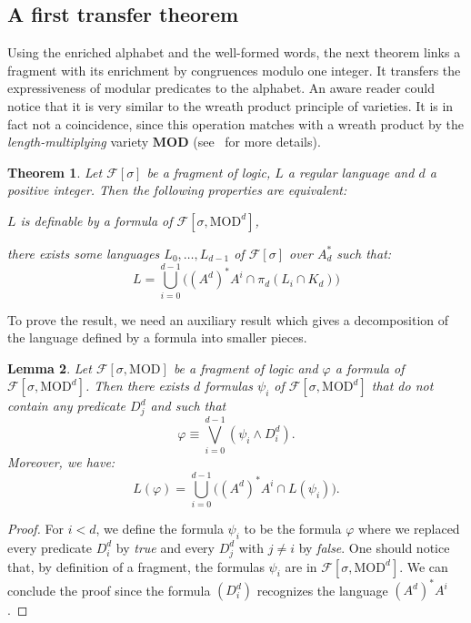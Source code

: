 \documentclass[submission,hidelink]{dmtcs-episciences}
\newtheorem{theorem}{Theorem}
\newtheorem{lemma}[theorem]{Lemma}
\newcommand{\WF}{K}
\newcommand{\cF}{\mathcal{F}}
\newcommand{\Ae}{A_d}
\newcommand{\MOD}{\mathrm{MOD}}
\newcommand{\MODV}{\mathbf{MOD}}
\newcommand{\Fsigmod}{\cF[\sigma,\MOD]}
\newcommand{\Fsigmodd}{\cF[\sigma, \MOD^d]}
\newenvironment{conditions}
{\begin{list}{\rm (\theenumi)}{\noindent \usecounter{enumi}\setlength{\topsep}{2pt}\setlength{\partopsep}{0pt}\setlength{\itemsep}{2pt}\setlength{\parsep}{0pt}\setlength{\leftmargin}{2.5em}\setlength{\labelwidth}{1.5em}\setlength{\labelsep}{0.5em}\setlength{\listparindent}{0pt}\setlength{\itemindent}{0pt}}}{\end{list}}
\begin{document}
\subsection{A first transfer theorem}
Using the enriched alphabet and the well-formed words, the next theorem links a fragment with its enrichment by congruences modulo one integer.
It transfers the expressiveness of modular predicates to the alphabet.
An aware reader could notice that it is very similar to the wreath product principle of varieties. It is in fact not a coincidence, since
this operation matches with a wreath product by the \emph{length-multiplying} variety ${\MODV}$ (see~\cite{CPS06b} for more details).
\begin{theorem}\label{semimod}
			Let $\cF[\sigma]$ be a fragment of logic,
			$L$ a regular language and $d$ a positive integer.
			Then the following properties are equivalent:
			\begin{conditions}
				\item\label{thmsemimod:1} $L$ is definable by a formula of $\cF[\sigma,\MOD^d]$,

				\item\label{thmsemimod:3} there exists
				      some languages $L_0,\ldots,L_{d-1}$ of
				      $\cF[\sigma]$ over $\Ae^*$ such that:\begin{equation}\label{equationLd}
				      L =\bigcup_{i=0}^{d-1}\big( (A^d)^*A^i\cap \pi_d(L_i\cap \WF_d)\big)
				      	      \tag{a}
				      \end{equation}
			\end{conditions}
\end{theorem}
		To prove the result,
 		we need an auxiliary result which gives a decomposition of the language defined by a formula into smaller pieces.

	\begin{lemma}\label{formNorm}
	Let $\Fsigmod$ be a fragment of logic and $\varphi$ a formula of $\Fsigmodd$.
	Then there exists $d$ formulas $\psi_i$ of $\Fsigmodd$ that do not contain any predicate $D_j^d$
	and such that $$\varphi\equiv \bigvee_{i=0}^{d-1}(\psi_i\wedge D_i^d).$$
	Moreover, we have:  $$L(\varphi)=\bigcup_{i = 0}^{d-1}  \big((A^d)^*A^i\cap L(\psi_i)\big).$$
	\end{lemma}
	\begin{proof}
	For $i<d$, we define the formula $\psi_i$ to be the formula $\varphi$ where we replaced
		every predicate $D_i^d$ by \emph{true} and every $D_j^d$ with $j\neq i$ by \emph{false}.
		One should notice that, by definition of a fragment, the formulas
		$\psi_i$ are in $\Fsigmodd$.
		We can conclude the proof since the formula $(D^d_i)$
		recognizes the language $(A^d)^*A^i$.
	\end{proof}
\end{document}
